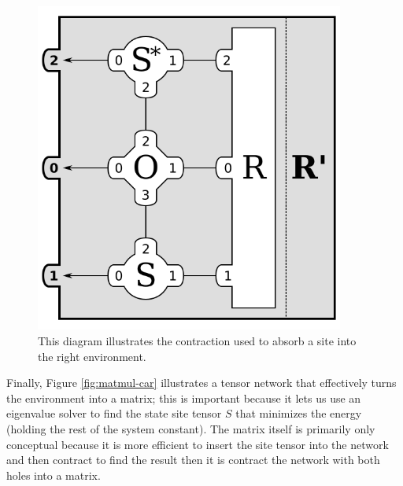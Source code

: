 \documentclass{article}
\newcommand{\diagramwidth}{4in}
\begin{document}
\begin{figure}\begin{center}
\includegraphics[width=\diagramwidth]{drawings/contractSOSRight-car}
\caption{\label{fig:contractSOSRight-car}This diagram illustrates the contraction used to absorb a site into the right environment.}
\end{center}\end{figure}

Finally, Figure \ref{fig:matmul-car} illustrates a tensor network that effectively turns the environment into a matrix;  this is important because it lets us use an eigenvalue solver to find the state site tensor $S$ that minimizes the energy (holding the rest of the system constant).  The matrix itself is primarily only conceptual because it is more efficient to insert the site tensor into the network and then contract to find the result then it is contract the network with both holes into a matrix.
\end{document}
